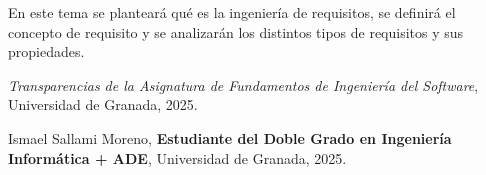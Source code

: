 \documentclass[a4paper,12pt]{book}
\begin{document}
En este tema se planteará qué es la ingeniería de requisitos, se definirá el concepto de requisito y se analizarán los distintos tipos de requisitos y sus propiedades.






\newpage
\begin{thebibliography}{99}
\emph{Transparencias de la Asignatura de Fundamentos de Ingeniería del Software}, Universidad de Granada, 2025.

Ismael Sallami Moreno, \textbf{Estudiante del Doble Grado en Ingeniería Informática + ADE}, Universidad de Granada, 2025.


\end{thebibliography}
\end{document}
